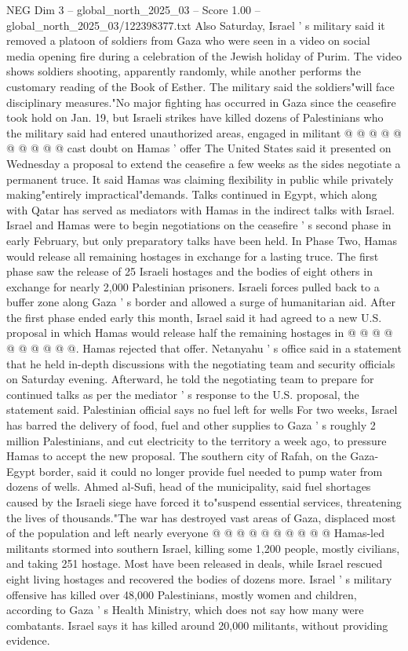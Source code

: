 \begin{textsample}{NEG Dim 3 – global\_north\_2025\_03 – Score 1.00 – global\_north\_2025\_03/122398377.txt}
Also Saturday, Israel ' s military said it removed a platoon of soldiers from Gaza who were seen in a video on social media opening fire during a celebration of the Jewish holiday of Purim.
The video shows soldiers shooting, apparently randomly, while another performs the customary reading of the Book of Esther.
The military said the soldiers"will face disciplinary measures."No major fighting has occurred in Gaza since the ceasefire took hold on Jan. 19, but Israeli strikes have killed dozens of Palestinians who the military said had entered unauthorized areas, engaged in militant @ @ @ @ @ @ @ @ @ @ cast doubt on Hamas ' offer The United States said it presented on Wednesday a proposal to extend the ceasefire a few weeks as the sides negotiate a permanent truce.
It said Hamas was claiming flexibility in public while privately making"entirely impractical"demands.
Talks continued in Egypt, which along with Qatar has served as mediators with Hamas in the indirect talks with Israel.
Israel and Hamas were to begin negotiations on the ceasefire ' s second phase in early February, but only preparatory talks have been held.
In Phase Two, Hamas would release all remaining hostages in exchange for a lasting truce.
The first phase saw the release of 25 Israeli hostages and the bodies of eight others in exchange for nearly 2,000 Palestinian prisoners.
Israeli forces pulled back to a buffer zone along Gaza ' s border and allowed a surge of humanitarian aid.
After the first phase ended early this month, Israel said it had agreed to a new U.S. proposal in which Hamas would release half the remaining hostages in @ @ @ @ @ @ @ @ @ @.
Hamas rejected that offer.
Netanyahu ' s office said in a statement that he held in-depth discussions with the negotiating team and security officials on Saturday evening.
Afterward, he told the negotiating team to prepare for continued talks as per the mediator ' s response to the U.S. proposal, the statement said.
Palestinian official says no fuel left for wells For two weeks, Israel has barred the delivery of food, fuel and other supplies to Gaza ' s roughly 2 million Palestinians, and cut electricity to the territory a week ago, to pressure Hamas to accept the new proposal.
The southern city of Rafah, on the Gaza-Egypt border, said it could no longer provide fuel needed to pump water from dozens of wells.
Ahmed al-Sufi, head of the municipality, said fuel shortages caused by the Israeli siege have forced it to"suspend essential services, threatening the lives of thousands."The war has destroyed vast areas of Gaza, displaced most of the population and left nearly everyone @ @ @ @ @ @ @ @ @ @ Hamas-led militants stormed into southern Israel, killing some 1,200 people, mostly civilians, and taking 251 hostage.
Most have been released in deals, while Israel rescued eight living hostages and recovered the bodies of dozens more.
Israel ' s military offensive has killed over 48,000 Palestinians, mostly women and children, according to Gaza ' s Health Ministry, which does not say how many were combatants.
Israel says it has killed around 20,000 militants, without providing evidence.

\end{textsample}
